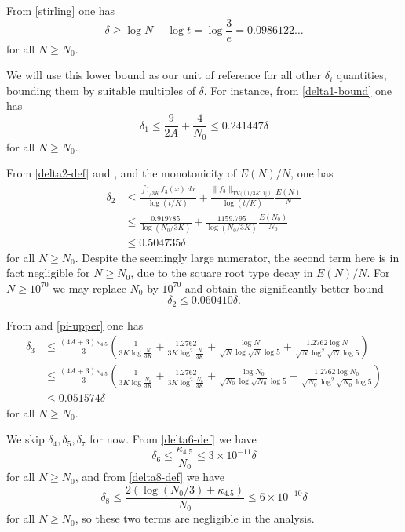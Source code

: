 \documentclass[10pt,a4paper,reqno]{amsart}
\numberwithin{equation}{section}
\theoremstyle{plain}
\theoremstyle{definition}
\begin{document}
From \eqref{stirling} one has
$$ \delta \geq \log N - \log t = \log \frac{3}{e} = 0.0986122\dots$$
for all $N \geq N_0$.

We will use this lower bound as our unit of reference for all other $\delta_i$ quantities, bounding them by suitable multiples of $\delta$.  For instance, from \eqref{delta1-bound} one has
$$ \delta_1 \leq \frac{9}{2A} + \frac{4}{N_0} \leq 0.241447 \delta$$
for all $N \geq N_0$.

From \eqref{delta2-def} and , and the monotonicity of $E(N)/N$, one has
\begin{align*}
  \delta_2 &\leq \frac{\int_{1/3K}^1 f_3(x)\ dx}{\log(t/K)}  + \frac{\|f_3\|_{\mathrm{TV}((1/3K,1])}}{\log(t/K)}  \frac{E(N)}{N} \\
  &\leq \frac{0.919785}{\log(N_0/3K)}  + \frac{1159.795}{\log(N_0/3K)}  \frac{E(N_0)}{N_0} \\
  &\leq 0.504735 \delta
\end{align*}
for all $N \geq N_0$.  Despite the seemingly large numerator, the second term here is in fact negligible for $N \geq N_0$, due to the square root type decay in $E(N)/N$. For $N \geq 10^{70}$ we may replace $N_0$ by $10^{70}$ and obtain the significantly better bound
$$ \delta_2 \leq 0.060410 \delta.$$

From  and \eqref{pi-upper} one has
\begin{align*}
\delta_3 &\leq \frac{(4A+3)\kappa_{4.5}}{3} \left(\!
\frac{1}{3K \log \frac{N}{3K}} + \frac{1.2762}{3K \log^2\! \frac{N}{3K}}
+ \frac{\log N}{\sqrt{N} \log\! \sqrt{N}\log 5 } + \frac{1.2762 \log N}{\sqrt{N} \log^2\!\! \sqrt{N}\log 5 } \!\right) \\
&\leq \frac{(4A+3)\kappa_{4.5}}{3} \left(\!
  \frac{1}{3K \log\frac{N_0}{3K}} + \frac{1.2762}{3K \log^2\!\frac{N_0}{3K}}
  + \frac{\log N_0}{\sqrt{N_0} \log\! \sqrt{N_0}\log 5 } + \frac{1.2762 \log N_0}{\sqrt{N_0} \log^2\!\! \sqrt{N_0}\log 5 }\! \right) \\
&\leq 0.051574 \delta
\end{align*}
for all $N \geq N_0$.

We skip $\delta_4, \delta_5, \delta_7$ for now.  From \eqref{delta6-def} we have
$$ \delta_6 \leq \frac{\kappa_{4.5}}{N_0} \leq 3 \times 10^{-11} \delta$$
for all $N \geq N_0$, and from \eqref{delta8-def} we have
$$ \delta_8 \leq \frac{2(\log(N_0/3) + \kappa_{4.5})}{N_0} \leq 6 \times 10^{-10} \delta$$
for all $N \geq N_0$, so these two terms are negligible in the analysis.
\end{document}
